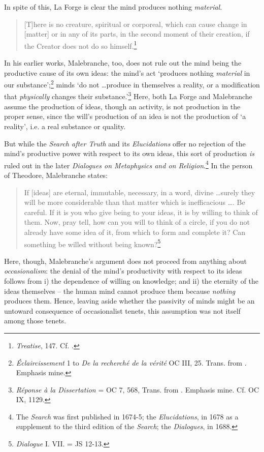 In spite of this, La Forge is clear the mind produces nothing \emph{material}.

\begin{quote}
	{[}T{]}here is no creature, spiritual or corporeal, which can cause change in {[}matter{]} or in any of its parts, in the second moment of their creation, if the Creator does not do so himself.\footnote{\emph{Treatise}, 147. Cf. \autocite{Klima1993}.}
\end{quote}

In his earlier works, Malebranche, too, does not rule out the mind being the productive cause of its own ideas: the mind's act `produces nothing \emph{material} in our substance';\footnote{\emph{Éclaircissement} 1 to \emph{De la recherché de la vérité} OC III, 25. Trans. from \autocite[52]{Nadler2005}. Emphasis mine.} minds `do not \ldots produce in themselves a reality, or a modification that \emph{physically} changes their substance.'\footnote{\emph{Réponse à la Dissertation} = OC 7, 568, Trans. from \autocite[52]{Nadler2005}. Emphasis mine. Cf. OC IX, 1129.} Here, both La Forge and Malebranche assume the production of ideas, though an activity, is not production in the proper sense, since the will's production of an idea is not the production of `a reality', i.e. a real substance or quality.

But while the \emph{Search after Truth} and its \emph{Elucidations} offer no rejection of the mind's productive power with respect to its own ideas, this sort of production \emph{is} ruled out in the later \emph{Dialogues on Metaphysics and on Religion}.\footnote{The \emph{Search} was first published in 1674-5; the \emph{Elucidations}, in 1678 as a supplement to the third edition of the \emph{Search}; the \emph{Dialogues}, in 1688.} In the person of Theodore, Malebranche states:

\begin{quote}
	If [ideas] are eternal, immutable, necessary, in a word, divine \ldots surely they will be more considerable than that matter which is inefficacious \ldots. Be careful. If it is you who give being to your ideas, it is by willing to think of them. Now, pray tell, how can you will to think of a circle, if you do not already have some idea of it, from which to form and complete it? Can something be willed without being known?\footnote{\emph{Dialogue} I. VII. = JS 12-13.}
\end{quote}

Here, though, Malebranche's argument does not proceed from anything about \emph{occasionalism}: the denial of the mind's productivity with respect to its ideas follows from i) the dependence of willing on knowledge; and ii) the eternity of the ideas themselves -- the human mind cannot produce them because \emph{nothing} produces them. Hence, leaving aside whether the passivity of minds might be an untoward consequence of occasionalist tenets, this assumption was not itself among those tenets.
